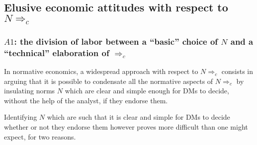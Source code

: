 \documentclass[preprint, french, english, 11pt, authoryear]{elsarticle}%
\newcommand{\protectforpdf}[1]{\texorpdfstring{\ensuremath{#1}}{#1}}
\begin{document}
\subsection{Elusive economic attitudes with respect to \protectforpdf{N ⇒_c}}
\subsubsection{\protectforpdf{A1}: the division of labor between a ``basic'' choice of \protectforpdf{N} and a ``technical'' elaboration of \protectforpdf{⇒_c}}

In normative economics, a widespread approach with respect to $N ⇒_c$ consists in arguing that it is possible to condensate all the normative aspects of $N ⇒_c$  by insulating norms $N$ which are clear and simple enough for \acp{DM} to decide, without the help of the analyst, if they endorse them.

Identifying $N$ which are such that it is clear and simple for \acp{DM} to decide whether or not they endorse them however proves more difficult than one might expect, for two reasons.
\end{document}
